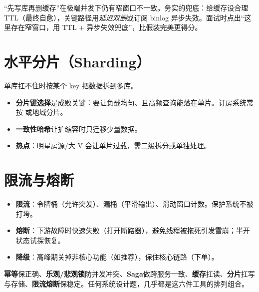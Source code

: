 \begin{pitfall}[缓存与数据库的双写不一致]
“先写库再删缓存”在极端并发下仍有窄窗口不一致。务实的兜底：给缓存设合理 TTL（最终自愈），关键路径用\emph{延迟双删}或订阅 binlog 异步失效。面试时点出“这里存在窄窗口，用 TTL + 异步失效兜底”，比假装完美更得分。
\end{pitfall}

\section{水平分片（Sharding）}

单库扛不住时按某个 key 把数据拆到多库。

\begin{itemize}
  \item \textbf{分片键选择}是成败关键：要让负载均匀、且高频查询能落在单片。订房系统常按  或地域分片。
  \item \textbf{一致性哈希}让扩缩容时只迁移少量数据。
  \item \textbf{热点}：明星房源/大 V 会让单片过载，需二级拆分或单独处理。
\end{itemize}

\section{限流与熔断}

\begin{itemize}
  \item \textbf{限流}：令牌桶（允许突发）、漏桶（平滑输出）、滑动窗口计数。保护系统不被打垮。
  \item \textbf{熔断}：下游故障时快速失败（打开断路器），避免线程被拖死引发雪崩；半开状态试探恢复。
  \item \textbf{降级}：高峰期关掉非核心功能（如推荐），保住核心链路（下单）。
\end{itemize}

\begin{keypoint}[一张思想地图]
\textbf{幂等}保正确、\textbf{乐观/悲观锁}防并发冲突、\textbf{Saga}做跨服务一致、\textbf{缓存}扛读、\textbf{分片}扛写与存储、\textbf{限流熔断}保稳定。任何系统设计题，几乎都是这六件工具的排列组合。
\end{keypoint}
